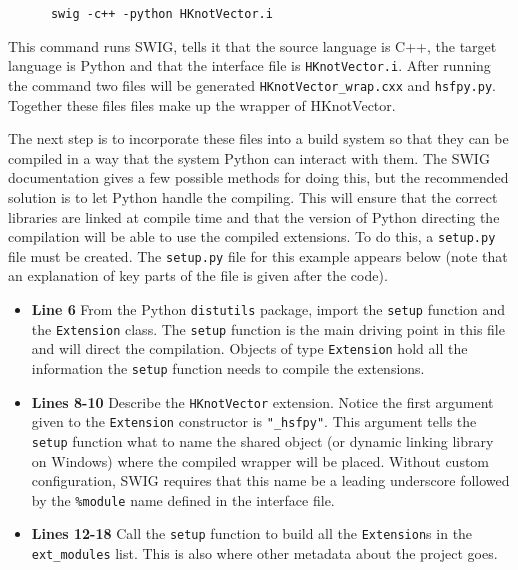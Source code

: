     \vspace{.2in}
    \begin{lstlisting}
      swig -c++ -python HKnotVector.i
    \end{lstlisting}
    \mainstretch{}

    \noindent This command runs SWIG, tells it that the source language is C++, the target language is Python and that the interface file is \texttt{HKnotVector.i}. After running the command two files will be generated \texttt{HKnotVector\_wrap.cxx} and \texttt{hsfpy.py}. Together these files files make up the wrapper of HKnotVector.

    The next step is to incorporate these files into a build system so that they can be compiled in a way that the system Python can interact with them. The SWIG documentation gives a few possible methods for doing this, but the recommended solution is to let Python handle the compiling. This will ensure that the correct libraries are linked at compile time and that the version of Python directing the compilation will be able to use the compiled extensions. To do this, a \texttt{setup.py} file must be created. The \texttt{setup.py} file for this example appears below (note that an explanation of key parts of the file is given after the code).

    \vspace{.2in}
    

    \begin{itemize}
      \item \textbf{Line 6} From the Python  \texttt{distutils} package, import the \texttt{setup} function and the \texttt{Extension} class. The \texttt{setup} function is the main driving point in this file and will direct the compilation. Objects of type \texttt{Extension} hold all the information the \texttt{setup} function needs to compile the extensions.
      \item \textbf{Lines 8-10} Describe the \texttt{HKnotVector} extension. Notice the first argument given to the \texttt{Extension} constructor is \texttt{"\_hsfpy"}. This argument tells the \texttt{setup} function what to name the shared object (or dynamic linking library on Windows) where the compiled wrapper will be placed. Without custom configuration, SWIG requires that this name be a leading underscore followed by the \texttt{\%module} name defined in the interface file.
      \item \textbf{Lines 12-18} Call the \texttt{setup} function to build all the \texttt{Extension}s in the \texttt{ext\_modules} list. This is also where other metadata about the project goes.
    \end{itemize}
    \mainstretch{}

